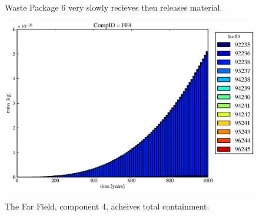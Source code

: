 \begin{figure}[ht]
\begin{minipage}[b]{0.45\linewidth}
  \caption[Case ODI Waste Package Contaminants.]{ 
    Waste Package 6 very slowly recieves then releases material. 
    }
  \label{fig:drIVwp6}
  \includegraphics[width=\textwidth]{./chapters/demonstration/base/od0.eps}
  \caption[Case ODI Waste Package Contaminants.]{ 
    The Far Field, component 4, acheives total containment.
    }
  \label{fig:drIVff0}


  \end{minipage}
\end{figure}
